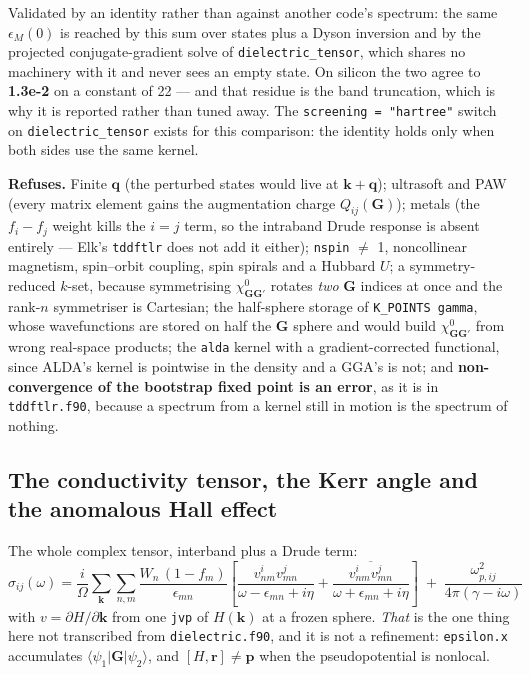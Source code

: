 \documentclass[11pt,a4paper]{article}
\newcommand{\code}[1]{\texttt{\small #1}}
\begin{document}
Validated by an identity rather than against another code's spectrum: the same
$\epsilon_M(0)$ is reached by this sum over states plus a Dyson inversion and by
the projected conjugate-gradient solve of \code{dielectric\_tensor}, which
shares no machinery with it and never sees an empty state. On silicon the two
agree to \textbf{1.3e-2} on a constant of 22 --- and that residue is the band
truncation, which is why it is reported rather than tuned away. The
\code{screening = "hartree"} switch on \code{dielectric\_tensor} exists for
this comparison: the identity holds only when both sides use the same kernel.

\begin{refuses}
\textbf{Refuses.} Finite $\mathbf q$ (the perturbed states would live at
$\mathbf k + \mathbf q$); ultrasoft and PAW (every matrix element gains the
augmentation charge $Q_{ij}(\mathbf G)$); metals (the $f_i - f_j$ weight kills
the $i=j$ term, so the intraband Drude response is absent entirely --- Elk's
\code{tddftlr} does not add it either); \code{nspin} $\neq$ 1, noncollinear
magnetism, spin--orbit coupling, spin spirals and a Hubbard $U$; a
symmetry-reduced $k$-set, because symmetrising $\chi^0_{\mathbf{GG}'}$ rotates
\emph{two} $\mathbf G$ indices at once and the rank-$n$ symmetriser is
Cartesian; the half-sphere storage of \code{K\_POINTS gamma}, whose
wavefunctions are stored on half the $\mathbf G$ sphere and would build
$\chi^0_{\mathbf{GG}'}$ from wrong real-space products; the \code{alda} kernel
with a gradient-corrected functional, since
ALDA's kernel is pointwise in the density and a GGA's is not; and
\textbf{non-convergence of the bootstrap fixed point is an error}, as it is in
\code{tddftlr.f90}, because a spectrum from a kernel still in motion is the
spectrum of nothing.
\end{refuses}

\subsection{The conductivity tensor, the Kerr angle and the anomalous Hall effect}

The whole complex tensor, interband plus a Drude term:
\begin{equation*}
\sigma_{ij}(\omega) = \frac{i}{\Omega}\sum_{\mathbf k}\sum_{n,m}
  \frac{W_n\,(1-f_m)}{\epsilon_{mn}}
  \left[\frac{v^i_{nm}v^j_{mn}}{\omega-\epsilon_{mn}+i\eta}
      + \frac{\overline{v^i_{nm}v^j_{mn}}}{\omega+\epsilon_{mn}+i\eta}\right]
  \;+\; \frac{\omega_{p,ij}^2}{4\pi(\gamma - i\omega)}
\end{equation*}
with $v = \partial H/\partial\mathbf k$ from one \code{jvp} of $H(\mathbf k)$ at
a frozen sphere. \emph{That} is the one thing here not transcribed from
\code{dielectric.f90}, and it is not a refinement: \code{epsilon.x} accumulates
$\langle\psi_1|\mathbf G|\psi_2\rangle$, and $[H,\mathbf r]\neq\mathbf p$ when
the pseudopotential is nonlocal.
\end{document}

